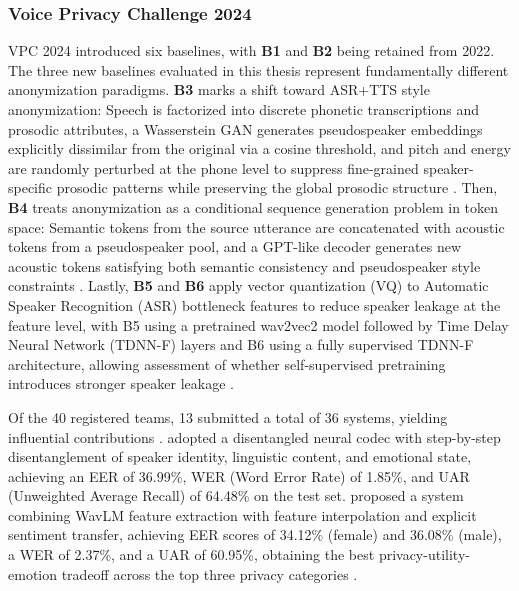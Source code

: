 \documentclass[12pt,leqno,a4paper]{article}
\begin{document}
\subsubsection{Voice Privacy Challenge 2024}
VPC 2024 introduced six baselines, with \textbf{B1} and \textbf{B2} being retained from 2022. 
The three new baselines evaluated in this thesis represent 
fundamentally different anonymization paradigms. \textbf{B3} \citep{meyer_prosody_2023} marks a 
shift toward ASR+TTS style anonymization: Speech is factorized into 
discrete phonetic transcriptions and prosodic attributes, a Wasserstein 
GAN generates pseudospeaker embeddings explicitly dissimilar from the 
original via a cosine threshold, and pitch and energy are randomly 
perturbed at the phone level to suppress fine-grained speaker-specific 
prosodic patterns while preserving the global prosodic structure 
\citep{tomashenko2024voiceprivacy2024challengeevaluation}.
Then, \textbf{B4} treats anonymization as a conditional sequence generation problem in token 
space: Semantic tokens from the source utterance are concatenated with 
acoustic tokens from a pseudospeaker pool, and a GPT-like decoder 
generates new acoustic tokens satisfying both semantic consistency and 
pseudospeaker style constraints 
\citep{tomashenko2024voiceprivacy2024challengeevaluation}. Lastly, \textbf{B5} and \textbf{B6} 
apply vector quantization (VQ) to Automatic Speaker Recognition (ASR) bottleneck features to reduce 
speaker leakage at the feature level, with B5 using a pretrained 
wav2vec2 model followed by Time Delay Neural Network (TDNN-F) layers and B6 using a fully 
supervised TDNN-F architecture, allowing assessment of whether 
self-supervised pretraining introduces stronger speaker leakage 
\citep{tomashenko2024voiceprivacy2024challengeevaluation}.

Of the 40 registered teams, 13 submitted a total of 36 systems, 
yielding influential contributions
\citep{tomashenko_third_2026}. \cite{yao2025npuntuvoiceprivacy2024} adopted a 
disentangled neural codec with step-by-step disentanglement of speaker 
identity, linguistic content, and emotional state, achieving an EER of 
36.99\%, WER (Word Error Rate) of 1.85\%, and UAR (Unweighted Average Recall) of 64.48\% on the test set. 
\cite{tan_system_nodate} proposed a system combining WavLM feature 
extraction with feature interpolation and explicit sentiment transfer, 
achieving EER scores of 34.12\% (female) and 36.08\% (male), a WER of 
2.37\%, and a UAR of 60.95\%, obtaining the best privacy-utility-emotion 
tradeoff across the top three privacy categories 
\citep{VoicePrivacy2024, tomashenko_third_2026}.
\end{document}
